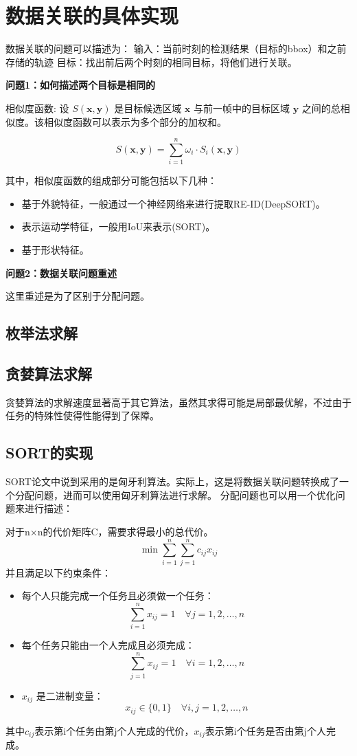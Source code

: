\chapter{数据关联的具体实现}
数据关联的问题可以描述为：
输入：当前时刻的检测结果（目标的bbox）和之前存储的轨迹
目标：找出前后两个时刻的相同目标，将他们进行关联。

\textbf{问题1：如何描述两个目标是相同的}

相似度函数:
设 \(S(\mathbf{x}, \mathbf{y})\) 是目标候选区域 \(\mathbf{x}\) 与前一帧中的目标区域 \(\mathbf{y}\) 之间的总相似度。该相似度函数可以表示为多个部分的加权和。

$$
	S(\mathbf{x}, \mathbf{y}) = \sum_{i=1}^{n} \omega_i \cdot S_i(\mathbf{x}, \mathbf{y})
$$

其中，相似度函数的组成部分可能包括以下几种：

\begin{itemize}[itemsep=-3pt]
	\item 基于外貌特征，一般通过一个神经网络来进行提取RE-ID(DeepSORT)。
	\item 表示运动学特征，一般用IoU来表示(SORT)。
	\item 基于形状特征。
\end{itemize}

\textbf{问题2：数据关联问题重述}

这里重述是为了区别于分配问题。


\section{枚举法求解}


\section{贪婪算法求解}
贪婪算法的求解速度显著高于其它算法，虽然其求得可能是局部最优解，不过由于任务的特殊性使得性能得到了保障。


\section{SORT的实现}
SORT论文中说到采用的是匈牙利算法。实际上，这是将数据关联问题转换成了一个分配问题，进而可以使用匈牙利算法进行求解。
分配问题也可以用一个优化问题来进行描述：
\begin{tcolorbox}
	对于n×n的代价矩阵C，需要求得最小的总代价。
	\[
	\min \sum_{i=1}^n \sum_{j=1}^n c_{ij} x_{ij}
	\]
	并且满足以下约束条件：
	\begin{itemize}
		\item 每个人只能完成一个任务且必须做一个任务：
		\[
		\sum_{i=1}^n x_{ij} = 1 \quad \forall j = 1, 2, \ldots, n
		\]
		\item 每个任务只能由一个人完成且必须完成：
		\[
		\sum_{j=1}^n x_{ij} = 1 \quad \forall i = 1, 2, \ldots, n
		\]
		\item \( x_{ij} \) 是二进制变量：
		\[
		x_{ij} \in \{0, 1\} \quad \forall i, j = 1, 2, \ldots, n
		\]
	\end{itemize}
	其中$c_{ij}$表示第i个任务由第j个人完成的代价，$x_{ij}$表示第i个任务是否由第j个人完成。
\end{tcolorbox}

